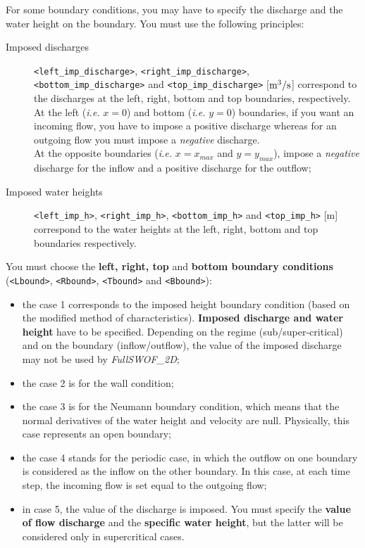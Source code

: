\documentclass[a4paper, 11pt]{article}
\newcommand{\FullSWOF}{\emph{FullSWOF\_2D}}
\begin{document}
For some boundary conditions, you may have to specify the discharge and the water height on the boundary. 
You must use the following principles:
\begin{description}
	\item[Imposed discharges] \sloppy \texttt{<left\_imp\_discharge>}, \texttt{<right\_imp\_discharge>}, \texttt{<bottom\_imp\_discharge>} and \texttt{<top\_imp\_discharge>} [$\rm m^{3}/s$] correspond to the discharges at the left, right, bottom and top boundaries, respectively.
		At the left (\textit{i.e.} $x=0$) and bottom (\textit{i.e.} $y=0$) boundaries, if you want an incoming flow, you have to impose a positive discharge whereas for an outgoing flow 
		you must impose a \textit{negative} discharge. \\At the opposite boundaries (\textit{i.e.} $x=x_{max}$ and $y=y_{max}$), impose a \textit{negative} discharge 
		for the inflow and a positive discharge for the outflow;
	\item[Imposed water heights] \texttt{<left\_imp\_h>}, \texttt{<right\_imp\_h>}, \texttt{<bottom\_imp\_h>} and \texttt{<top\_imp\_h>} [m] correspond to the water heights at the left, right, bottom and top boundaries respectively.
\end{description}
You must choose the \textbf{left, right, top} and \textbf{bottom boundary conditions} (\texttt{<Lbound>},
\texttt{<Rbound>}, \texttt{<Tbound>} and \texttt{<Bbound>}):
\begin{itemize}
	\item the case 1 corresponds to the imposed height boundary condition (based on the modified method of characteristics).
		\textbf{Imposed discharge and water height} have to be specified.
		Depending on the regime (sub/super-critical) and on the boundary (inflow/outflow), the value of the imposed discharge may not be used by \FullSWOF;
	\item the case 2 is for the wall condition; 
	\item the case 3 is for the Neumann boundary condition, which means that the normal derivatives of the water height and velocity are null. 
		Physically, this case represents an open boundary;
	\item the case 4 stands for the periodic case, in which the outflow on one boundary is considered as the inflow on the other boundary. In this case, at each time step, 
the incoming flow is set equal to the outgoing flow;
	\item in case 5, the value of the discharge is imposed. You must specify the \textbf{value of flow discharge} and the \textbf{specific water height}, but
  the latter will be considered only in supercritical cases.
\end{itemize}
\end{document}

